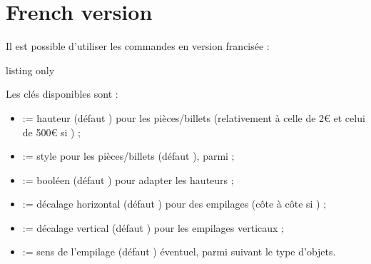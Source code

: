 \documentclass[11pt,a4paper]{ltxdoc}
\begin{document}
\begin{DemoCode}{}
\end{DemoCode}

\begin{DemoCode}{}
\end{DemoCode}

\begin{DemoCode}{}
\end{DemoCode}

\pagebreak

\section{French version}

Il est possible d'utiliser les commandes en version francisée :

\begin{DemoCode}{listing only}
\end{DemoCode}

Les clés disponibles sont :

\begin{itemize}
	\item {} := hauteur (défaut \MontreCode{2cm}) pour les pièces/billets (relativement à celle de 2€ et celui de 500€ si ) ;
	\item {} := style pour les pièces/billets (défaut ), parmi  ;
	\item {} := booléen (défaut ) pour adapter les hauteurs ;
	\item {} := décalage horizontal (défaut \MontreCode{0pt}) pour des empilages (côte à côte si \MontreCode{0pt}) ;
	\item {} := décalage vertical (défaut \MontreCode{5mm}) pour les empilages verticaux ;
	\item {} := sens de l'empilage (défaut ) éventuel, parmi  suivant le type d'objets.
\end{itemize}
\end{document}
